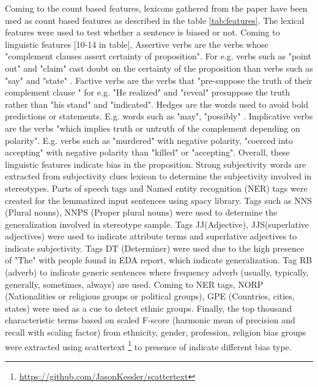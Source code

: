 Coming to the count based features, lexicons gathered from the paper  \cite{recasens2013linguistic}  have been used as count based features as described in the table \ref{tab:features}. The lexical features were used to test whether a sentence is biased or not. Coming to linguistic features [10-14 in table], Assertive verbs \cite{hooper1975assertive} are the verbs whose "complement clauses assert certainty of proposition"\cite{recasens2013linguistic}. For e.g. verbs such as "point out" and "claim" cast doubt on the certainty of the proposition than verbs such as "say" and "state" \cite{recasens2013linguistic}. Factive verbs \cite{kiparsky1970progress} are the verbs that "pre-suppose the truth of their complement clause "\cite{recasens2013linguistic} for e.g. "He realized" and "reveal" presuppose the truth rather than  "his stand" and "indicated". Hedges are the words used to avoid bold predictions or statements. E.g. words such as "may", "possibly" \cite{recasens2013linguistic}. Implicative verbs \cite{karttunen1971implicative} are the verbs "which implies truth or untruth of the complement depending on polarity"\cite{recasens2013linguistic}. E.g. verbs such as "murdered" with negative polarity, "coerced into accepting" with negative polarity than "killed" or "accepting". Overall, these linguistic features indicate bias in the proposition. Strong subjectivity words are extracted from subjectivity clues lexicon \cite{wilson2005recognizing} to determine the subjectivity involved in stereotypes. Parts of speech tags and Named entity recognition (NER) tags were created for the lemmatized input sentences using spacy  library. Tags such as NNS (Plural nouns), NNPS (Proper plural nouns) were used to determine the generalization involved in stereotype sample. Tags JJ(Adjective), JJS(superlative adjectives) were used to indicate attribute terms and superlative adjectives to indicate subjectivity. Tags DT (Determiner) were used due to the high presence of "The" with people found in EDA report, which indicate generalization. Tag RB (adverb) to indicate generic sentences where frequency adverb (usually, typically, generally, sometimes, always) are used. Coming to NER tags, NORP (Nationalities or religious groups or political groups), GPE (Countries, cities, states) were used as a cue to detect ethnic groups. Finally, the top thousand characteristic terms based on scaled F-score (harmonic mean of precision and recall with scaling factor) from ethnicity, gender, profession, religion bias groups were extracted using scattertext \footnote{\url{https://github.com/JasonKessler/scattertext}} to presence of indicate different bias type.

